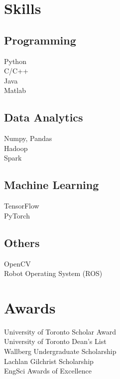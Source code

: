 \documentclass[]{deedy-resume-openfont}
\begin{document}
\begin{minipage}[t]{0.33\textwidth}
\sectionsep

\vspace{5mm}
\section{Skills}
    \subsection{Programming}
        \textbullet{} Python \\ 
        \textbullet{} C/C++ \\
        \textbullet{} Java \\
        \textbullet{} Matlab \\
    \vspace{5mm}
    \subsection{Data Analytics}
        \textbullet{} Numpy, Pandas \\
        \textbullet{} Hadoop \\
        \textbullet{} Spark \\
    \vspace{5mm}
    \subsection{Machine Learning}
        \textbullet{} TensorFlow \\
        \textbullet{} PyTorch \\
    \vspace{5mm}
    \subsection{Others}
        \textbullet{} OpenCV \\
        \textbullet{} Robot Operating System (ROS) \\

\vspace{5mm}
\section{Awards} 
University of Toronto Scholar Award \\
University of Toronto Dean's List  \\
Wallberg Undergraduate Scholarship \\
Lachlan Gilchrist Scholarship \\
EngSci Awards of Excellence


\sectionsep


%
%

\end{minipage} 
\end{document}
